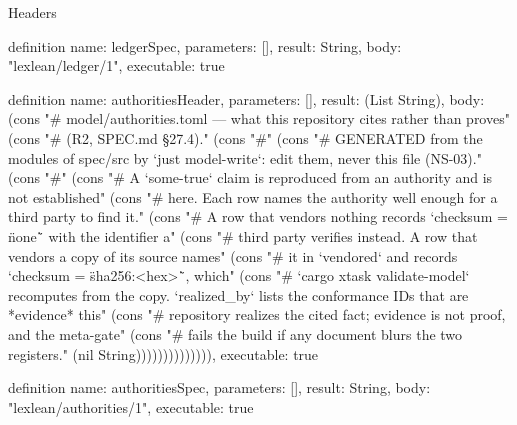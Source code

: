 \begin{lexlean}{Headers}
\begin{semanticmodule}
definition{
  name: ledgerSpec,
  parameters: [],
  result: String,
  body: "lexlean/ledger/1",
  executable: true
}

definition{
  name: authoritiesHeader,
  parameters: [],
  result: (List String),
  body: (cons "# model/authorities.toml --- what this repository cites rather than proves" (cons "# (R2, SPEC.md §27.4)." (cons "#" (cons "# GENERATED from the modules of spec/src by `just model-write`: edit them, never this file (NS-03)." (cons "#" (cons "# A `some-true` claim is reproduced from an authority and is not established" (cons "# here. Each row names the authority well enough for a third party to find it." (cons "# A row that vendors nothing records `checksum = \"none\"` with the identifier a" (cons "# third party verifies instead. A row that vendors a copy of its source names" (cons "# it in `vendored` and records `checksum = \"sha256:<hex>\"`, which" (cons "# `cargo xtask validate-model` recomputes from the copy. `realized_by` lists the conformance IDs that are *evidence* this" (cons "# repository realizes the cited fact; evidence is not proof, and the meta-gate" (cons "# fails the build if any document blurs the two registers." (nil String)))))))))))))),
  executable: true
}

definition{
  name: authoritiesSpec,
  parameters: [],
  result: String,
  body: "lexlean/authorities/1",
  executable: true
}
\end{semanticmodule}
\end{lexlean}

